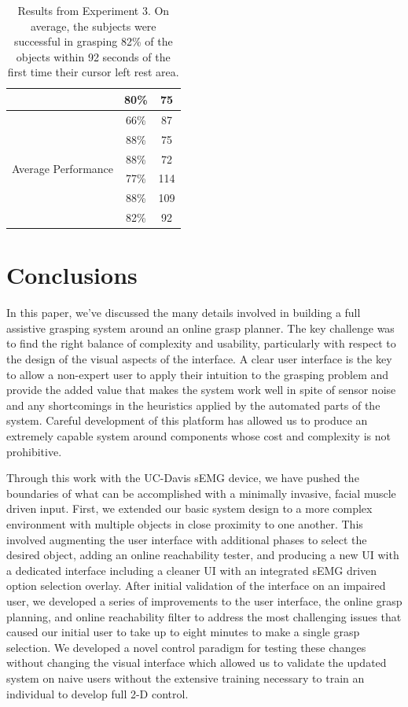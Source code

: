 \begin{table}[ht!]
\begin{minipage}[!t]{.4\textwidth}
\begin{tabular}[t!]{ | c c c | }
& 80\% & 75\\\hline 
\multirow{6}{*}{\begin{minipage}[t]{0.2\columnwidth}Average Performance\end{minipage}} & 66\% & 87 \\
& 88\% & 75 \\
& 88\% & 72 \\
& 77\% & 114 \\
& 88\% &  109\\ 
& 82\% & 92\\\hline 
\end{tabular}
\end{minipage}
\caption{Results from Experiment 3. On average, the subjects were successful in grasping 82\% of the objects within 92 seconds of the first time their cursor left rest area.}
\label{tab:results_3}
\end{table}

\section{Conclusions}
In this paper, we've discussed the many details involved in building a full assistive grasping system around an online grasp planner. The key challenge was to find the right balance of complexity and usability, particularly with respect to the design of the visual aspects of the interface. A clear user interface is the key to allow a non-expert user to apply their intuition to the grasping problem and provide the added value that makes the system work well in spite of sensor noise and any shortcomings in the heuristics applied by the automated parts of the system. Careful development of this platform has allowed us to produce an extremely capable system around components whose cost and complexity is not prohibitive. 

Through this work with the UC-Davis sEMG device, we have pushed the boundaries of what can be accomplished with a minimally invasive, facial muscle driven input. First, we extended our basic system design to a more complex environment with multiple objects in close proximity to one another. This involved augmenting the user interface with additional phases to select the desired object, adding an online reachability tester, and producing a new UI with a dedicated interface including a cleaner UI with an integrated sEMG driven option selection overlay. After initial validation of the interface on an impaired user, we developed a series of improvements to the user interface, the online grasp planning, and online reachability filter to address the most challenging issues that caused our initial user to take up to eight minutes to make a single grasp selection. We developed a novel control paradigm for testing these changes without changing the visual interface which allowed us to validate the updated system on naive users without the extensive training necessary to train an individual to develop full 2-D control. 

